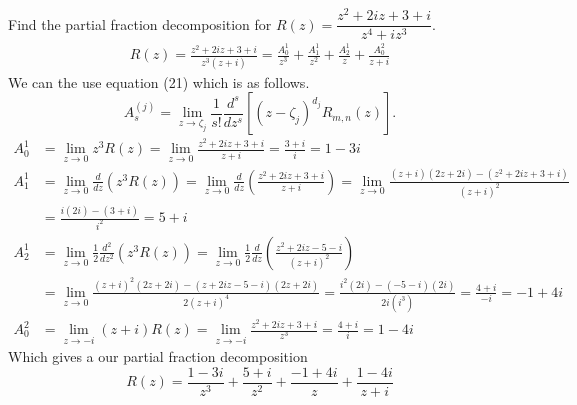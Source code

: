 \documentclass[12pt]{article}
\newenvironment{problem}[2][Problem]{\begin{trivlist}
\item[\hskip \labelsep {\bfseries #1} \hskip \labelsep {\bfseries #2.}]}{\end{trivlist}}
\begin{document}
\begin{problem}{1}
	Find the partial fraction decomposition for $R(z) = \dfrac{z^2 + 2iz + 3 + i}{z^4 + iz^3}$.	
	\begin{align*}
		R(z) = \frac{z^2 + 2iz + 3 + i}{z^3(z + i)} = \frac{A_0^1}{z^3} + \frac{A_1^1}{z^2} + \frac{A_2^1}{z} + \frac{A_0^2}{z+i}
	\end{align*}
	We can the use equation (21) which is as follows.
	\[
		A_s^{(j)} = \lim_{z \to \zeta_j} \frac{1}{s!} \frac{d^s}{dz^s}[(z - \zeta_j)^{d_j}R_{m,n}(z)].
	\]
	\begin{align*}
		A_0^1 &= \lim_{z \to 0} z^3 R(z) = \lim_{z\to 0} \frac{z^2 + 2iz + 3 + i}{z + i} = \frac{3 + i}{i} = 1 - 3i \\
		A_1^1 &= \lim_{z \to 0} \frac{d}{dz}(z^3 R(z)) = \lim_{z \to 0} \frac{d}{dz}\left(\frac{z^2 + 2iz + 3 + i}{z + i}\right) = \lim_{z \to 0} \frac{(z + i)(2z + 2i) - (z^2 + 2iz + 3 + i)}{(z + i)^2} \\
		      &= \frac{i(2i) - (3 + i)}{i^2} = 5 + i \\
		A_2^1 &= \lim_{z \to 0} \frac{1}{2} \frac{d^2}{dz^2}(z^3 R(z)) = \lim_{z \to 0} \frac{1}{2} \frac{d}{dz} \left(\frac{z^2 + 2iz - 5 - i}{(z+i)^2}\right) \\
		      &= \lim_{z \to 0} \frac{(z+i)^2(2z + 2i) - (z + 2iz - 5 - i)(2z + 2i)}{2(z + i)^4} = \frac{i^2(2i) - (-5 -i)(2i)}{2i(i^3)} = \frac{4 + i}{-i} = -1 + 4i \\
		A_0^2 &= \lim_{z \to -i} (z + i)R(z) = \lim_{z \to -i} \frac{z^2 + 2iz + 3 + i}{z^3} = \frac{4 + i}{i} = 1 - 4i
	\end{align*}
	Which gives a our partial fraction decomposition
	\[
		R(z) = \frac{1-3i}{z^3} + \frac{5+i}{z^2} + \frac{-1+4i}{z} + \frac{1 - 4i}{z + i}
	\]
\end{problem}
\end{document}
